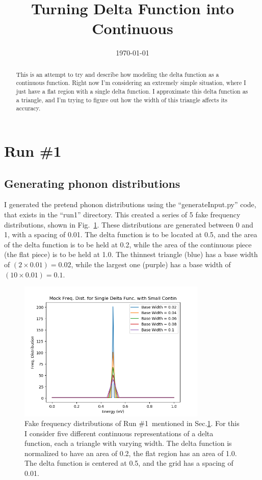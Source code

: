 \documentclass[a4paper]{article}
\title{Turning Delta Function into Continuous}
\date{\today}
\begin{document}
\maketitle

\begin{abstract}
This is an attempt to try and describe how modeling the delta function as a continuous function. Right now I'm considering an extremely simple situation, where I just have a flat region with a single delta function. I approximate this delta function as a triangle, and I'm trying to figure out how the width of this triangle affects its accuracy.
\end{abstract}



\section{Run \#1}\label{sec:run1}
\subsection{Generating phonon distributions}
I generated the pretend phonon distributions using the ``generateInput.py'' code, that exists in the ``run1'' directory. This created a series of 5 fake frequency distributions, shown in Fig.~\ref{fig:run1}. These distributions are generated between 0 and 1, with a spacing of 0.01. The delta function is to be located at 0.5, and the area of the delta function is to be held at 0.2, while the area of the continuous piece (the flat piece) is to be held at 1.0. The thinnest triangle (blue) has a base width of $(2\times0.01)=0.02$, while the largest one (purple) has a base width of $(10\times0.01)=0.1$.

\begin{figure}[H]
\centering
\includegraphics[width=0.8\textwidth]{phononDist_run1}
\caption{\label{fig:run1}Fake frequency distributions of Run \#1~mentioned in Sec.\ref{sec:run1}. For this I consider five different continuous representations of a delta function, each a triangle with varying width. The delta function is normalized to have an area of 0.2, the flat region has an area of 1.0. The delta function is centered at 0.5, and the grid has a spacing of 0.01.}
\end{figure}
\end{document}

